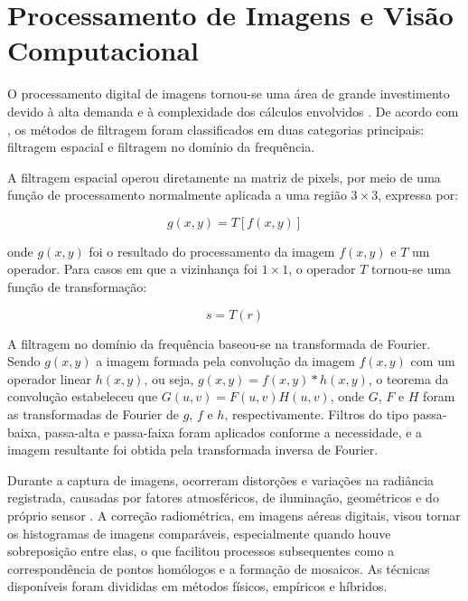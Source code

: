 \documentclass[
    12pt,
    openright,
    oneside,
    a4paper,
    sumario=tradicional,
    english,
    brazil,
    ]{abntex2}
\begin{document}
\section{Processamento de Imagens e Visão Computacional}

O processamento digital de imagens tornou-se uma área de grande investimento devido à alta demanda e à complexidade dos cálculos envolvidos \cite{s24082481}. De acordo com \textcite{marques1999processamento}, os métodos de filtragem foram classificados em duas categorias principais: filtragem espacial e filtragem no domínio da frequência.

A filtragem espacial operou diretamente na matriz de pixels, por meio de uma função de processamento normalmente aplicada a uma região $3 \times 3$, expressa por:

\begin{equation}
    g(x,y)=T[f(x,y)]
\end{equation}

onde $g(x,y)$ foi o resultado do processamento da imagem $f(x,y)$ e $T$ um operador. Para casos em que a vizinhança foi $1 \times 1$, o operador $T$ tornou-se uma função de transformação:

\begin{equation}
    s = T(r)
\end{equation}

A filtragem no domínio da frequência baseou-se na transformada de Fourier. Sendo $g(x,y)$ a imagem formada pela convolução da imagem $f(x,y)$ com um operador linear $h(x,y)$, ou seja, $g(x,y) = f(x,y)*h(x,y)$, o teorema da convolução estabeleceu que $G(u,v) = F(u,v)H(u,v)$, onde $G$, $F$ e $H$ foram as transformadas de Fourier de $g$, $f$ e $h$, respectivamente. Filtros do tipo passa-baixa, passa-alta e passa-faixa foram aplicados conforme a necessidade, e a imagem resultante foi obtida pela transformada inversa de Fourier.

Durante a captura de imagens, ocorreram distorções e variações na radiância registrada, causadas por fatores atmosféricos, de iluminação, geométricos e do próprio sensor \cite{figueiredo2005conceitos}. A correção radiométrica, em imagens aéreas digitais, visou tornar os histogramas de imagens comparáveis, especialmente quando houve sobreposição entre elas, o que facilitou processos subsequentes como a correspondência de pontos homólogos e a formação de mosaicos. As técnicas disponíveis foram divididas em métodos físicos, empíricos e híbridos.
\end{document}
